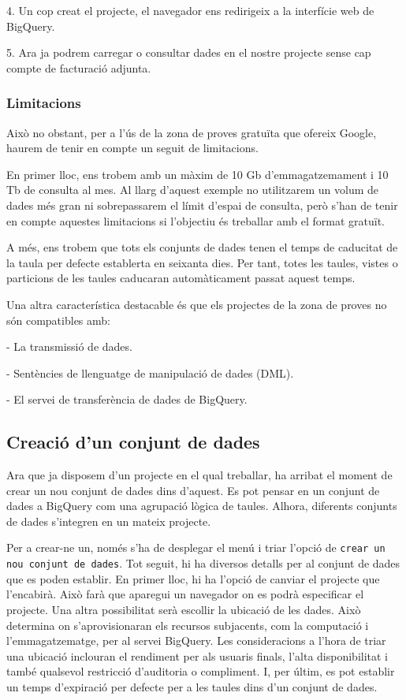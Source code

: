 \documentclass[12pt,longbibliography]{article}
\theoremstyle{definition}
\theoremstyle{remark}
\begin{document}
4. Un cop creat el projecte, el navegador ens redirigeix a la interfície web de BigQuery.



5. Ara ja podrem carregar o consultar dades en el nostre projecte sense cap compte de facturació adjunta.

\subsubsection{Limitacions}

Això no obstant, per a l’ús de la zona de proves gratuïta que ofereix Google, haurem de tenir en compte un seguit de limitacions.



En primer lloc, ens trobem amb un màxim de 10 Gb d’emmagatzemament i 10 Tb de consulta al mes. Al llarg d’aquest exemple no utilitzarem un volum de dades més gran ni sobrepassarem el límit d’espai de consulta, però s’han de tenir en compte aquestes limitacions si l’objectiu és treballar amb el format gratuït.



A més, ens trobem que tots els conjunts de dades tenen el temps de caducitat de la taula per defecte establerta en seixanta dies. Per tant, totes les taules, vistes o particions de les taules caducaran automàticament passat aquest temps.



Una altra característica destacable és que els projectes de la zona de proves no són compatibles amb:

- La transmissió de dades.

- Sentències de llenguatge de manipulació de dades (DML).

- El servei de transferència de dades de BigQuery.

\subsection{Creació d'un conjunt de dades}

Ara que ja disposem d'un projecte en el qual treballar, ha arribat el moment de crear un nou conjunt de dades dins d'aquest. Es pot pensar en un conjunt de dades a BigQuery com una agrupació lògica de taules. Alhora, diferents conjunts de dades s'integren en un mateix projecte. 



Per a crear-ne un, només s'ha de desplegar el menú i triar l'opció de \texttt{crear un nou conjunt de dades}. Tot seguit, hi ha diversos detalls per al conjunt de dades que es poden establir. En primer lloc, hi ha l'opció de canviar el projecte que l'encabirà. Això farà que aparegui un navegador on es podrà especificar el projecte. Una altra possibilitat serà escollir la ubicació de les dades. Això determina on s'aprovisionaran els recursos subjacents, com la computació i l'emmagatzematge, per al servei BigQuery. Les consideracions a l'hora de triar una ubicació inclouran el rendiment per als usuaris finals, l'alta disponibilitat i també qualsevol restricció d'auditoria o compliment. I, per últim, es pot establir un temps d'expiració per defecte per a les taules dins d'un conjunt de dades.
\end{document}
